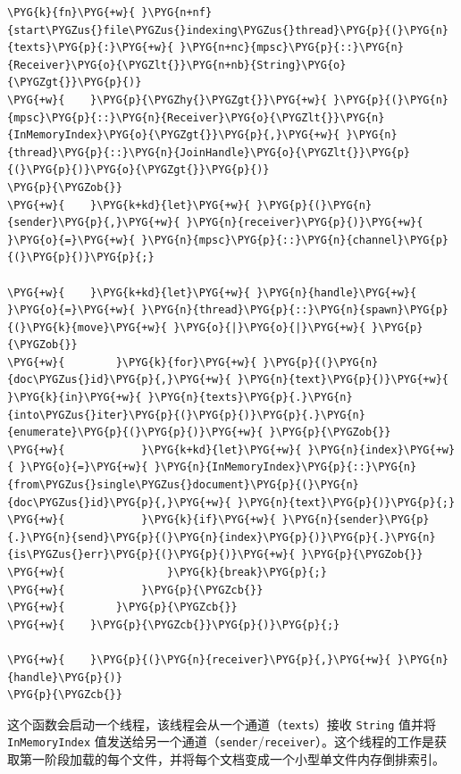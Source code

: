 \begin{Verbatim}[commandchars=\\\{\},breaklines=true,breakanywhere=true,fontsize=\codefont,xleftmargin=17bp]
\PYG{k}{fn}\PYG{+w}{ }\PYG{n+nf}{start\PYGZus{}file\PYGZus{}indexing\PYGZus{}thread}\PYG{p}{(}\PYG{n}{texts}\PYG{p}{:}\PYG{+w}{ }\PYG{n+nc}{mpsc}\PYG{p}{::}\PYG{n}{Receiver}\PYG{o}{\PYGZlt{}}\PYG{n+nb}{String}\PYG{o}{\PYGZgt{}}\PYG{p}{)}
\PYG{+w}{    }\PYG{p}{\PYGZhy{}\PYGZgt{}}\PYG{+w}{ }\PYG{p}{(}\PYG{n}{mpsc}\PYG{p}{::}\PYG{n}{Receiver}\PYG{o}{\PYGZlt{}}\PYG{n}{InMemoryIndex}\PYG{o}{\PYGZgt{}}\PYG{p}{,}\PYG{+w}{ }\PYG{n}{thread}\PYG{p}{::}\PYG{n}{JoinHandle}\PYG{o}{\PYGZlt{}}\PYG{p}{(}\PYG{p}{)}\PYG{o}{\PYGZgt{}}\PYG{p}{)}
\PYG{p}{\PYGZob{}}
\PYG{+w}{    }\PYG{k+kd}{let}\PYG{+w}{ }\PYG{p}{(}\PYG{n}{sender}\PYG{p}{,}\PYG{+w}{ }\PYG{n}{receiver}\PYG{p}{)}\PYG{+w}{ }\PYG{o}{=}\PYG{+w}{ }\PYG{n}{mpsc}\PYG{p}{::}\PYG{n}{channel}\PYG{p}{(}\PYG{p}{)}\PYG{p}{;}

\PYG{+w}{    }\PYG{k+kd}{let}\PYG{+w}{ }\PYG{n}{handle}\PYG{+w}{ }\PYG{o}{=}\PYG{+w}{ }\PYG{n}{thread}\PYG{p}{::}\PYG{n}{spawn}\PYG{p}{(}\PYG{k}{move}\PYG{+w}{ }\PYG{o}{|}\PYG{o}{|}\PYG{+w}{ }\PYG{p}{\PYGZob{}}
\PYG{+w}{        }\PYG{k}{for}\PYG{+w}{ }\PYG{p}{(}\PYG{n}{doc\PYGZus{}id}\PYG{p}{,}\PYG{+w}{ }\PYG{n}{text}\PYG{p}{)}\PYG{+w}{ }\PYG{k}{in}\PYG{+w}{ }\PYG{n}{texts}\PYG{p}{.}\PYG{n}{into\PYGZus{}iter}\PYG{p}{(}\PYG{p}{)}\PYG{p}{.}\PYG{n}{enumerate}\PYG{p}{(}\PYG{p}{)}\PYG{+w}{ }\PYG{p}{\PYGZob{}}
\PYG{+w}{            }\PYG{k+kd}{let}\PYG{+w}{ }\PYG{n}{index}\PYG{+w}{ }\PYG{o}{=}\PYG{+w}{ }\PYG{n}{InMemoryIndex}\PYG{p}{::}\PYG{n}{from\PYGZus{}single\PYGZus{}document}\PYG{p}{(}\PYG{n}{doc\PYGZus{}id}\PYG{p}{,}\PYG{+w}{ }\PYG{n}{text}\PYG{p}{)}\PYG{p}{;}
\PYG{+w}{            }\PYG{k}{if}\PYG{+w}{ }\PYG{n}{sender}\PYG{p}{.}\PYG{n}{send}\PYG{p}{(}\PYG{n}{index}\PYG{p}{)}\PYG{p}{.}\PYG{n}{is\PYGZus{}err}\PYG{p}{(}\PYG{p}{)}\PYG{+w}{ }\PYG{p}{\PYGZob{}}
\PYG{+w}{                }\PYG{k}{break}\PYG{p}{;}
\PYG{+w}{            }\PYG{p}{\PYGZcb{}}
\PYG{+w}{        }\PYG{p}{\PYGZcb{}}
\PYG{+w}{    }\PYG{p}{\PYGZcb{}}\PYG{p}{)}\PYG{p}{;}

\PYG{+w}{    }\PYG{p}{(}\PYG{n}{receiver}\PYG{p}{,}\PYG{+w}{ }\PYG{n}{handle}\PYG{p}{)}
\PYG{p}{\PYGZcb{}}
\end{Verbatim}

这个函数会启动一个线程，该线程会从一个通道（\texttt{texts}）接收 \texttt{String} 值并将 \texttt{InMemoryIndex} 值发送给另一个通道（\texttt{sender}/\texttt{receiver}）。这个线程的工作是获取第一阶段加载的每个文件，并将每个文档变成一个小型单文件内存倒排索引。

